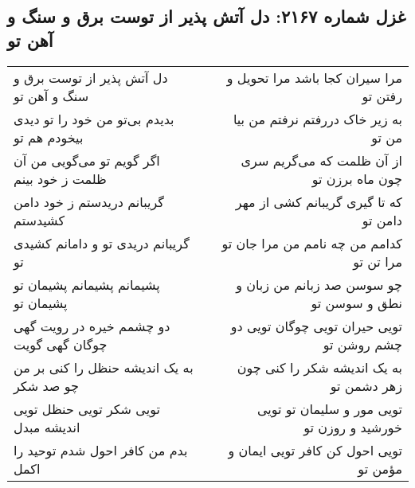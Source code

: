\begin{center}
\section*{غزل شماره ۲۱۶۷: دل آتش پذیر از توست برق و سنگ و آهن تو}
\label{sec:2167}
\begin{longtable}{l p{0.5cm} r}
دل آتش پذیر از توست برق و سنگ و آهن تو
&&
مرا سیران کجا باشد مرا تحویل و رفتن تو
\\
بدیدم بی‌تو من خود را تو دیدی بیخودم هم تو
&&
به زیر خاک دررفتم نرفتم من بیا من تو
\\
اگر گویم تو می‌گویی من آن ظلمت ز خود بینم
&&
از آن ظلمت که می‌گریم سری چون ماه برزن تو
\\
گریبانم دریدستم ز خود دامن کشیدستم
&&
که تا گیری گریبانم کشی از مهر دامن تو
\\
گریبانم دریدی تو و دامانم کشیدی تو
&&
کدامم من چه نامم من مرا جان تو مرا تن تو
\\
پشیمانم پشیمانم پشیمان تو پشیمان تو
&&
چو سوسن صد زبانم من زبان و نطق و سوسن تو
\\
دو چشمم خیره در رویت گهی چوگان گهی گویت
&&
تویی حیران تویی چوگان تویی دو چشم روشن تو
\\
به یک اندیشه حنظل را کنی بر من چو صد شکر
&&
به یک اندیشه شکر را کنی چون زهر دشمن تو
\\
تویی شکر تویی حنظل تویی اندیشه مبدل
&&
تویی مور و سلیمان تو تویی خورشید و روزن تو
\\
بدم من کافر احول شدم توحید را اکمل
&&
تویی احول کن کافر تویی ایمان و مؤمن تو
\\
\end{longtable}
\end{center}
